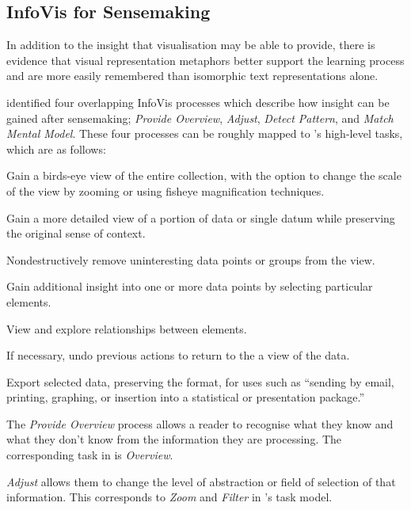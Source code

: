 \subsection{InfoVis for Sensemaking}

In addition to the insight that visualisation may be able to provide, there is evidence that visual representation metaphors better support the learning process and are more easily remembered than isomorphic text representations alone\citep{KnowledgeMapsAsScaffolds, ImageBasedConceptMapping}.

\citet{UnderstandingAndCharacterizingInsights} identified four overlapping InfoVis processes which describe how insight can be gained after sensemaking; \textit{Provide Overview}, \textit{Adjust}, \textit{Detect Pattern}, and \textit{Match Mental Model}. These four processes can be roughly mapped to \citeauthor{TheEyesHaveIt}'s high-level tasks, which are as follows:

\begin{description}[leftmargin=11em,style=nextline]
	\item [Overview] Gain a birds-eye view of the entire collection, with the option to change the scale of the view by zooming or using fisheye magnification techniques.
	\item[Zoom] Gain a more detailed view of a portion of data or single datum while preserving the original sense of context.
	\item[Filter] Nondestructively remove uninteresting data points or groups from the view.
	\item[Details-on-Demand] Gain additional insight into one or more data points by selecting particular elements.
	\item[Relate] View and explore relationships between elements.
	\item[History] If necessary, undo previous actions to return to the a view of the data.
	\item[Extract] Export selected data, preserving the format, for uses such as ``sending by email, printing, graphing, or insertion into a statistical or presentation package.'' \citep[p.5]{TheEyesHaveIt}
\end{description}

The \textit{Provide Overview} process allows a reader to recognise what they know and what they don't know from the information they are processing. The corresponding task in \citep{TheEyesHaveIt} is \textit{Overview}.

\textit{Adjust} allows them to change the level of abstraction or field of selection of that information. This corresponds to \textit{Zoom} and \textit{Filter} in \citeauthor{TheEyesHaveIt}'s task model.

